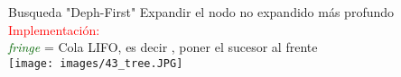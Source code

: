 \begin{frame}{Busqueda "Deph-First"}
    Expandir el nodo no expandido más profundo
    \\
    \textcolor{Red}{\large{Implementación:}}
    \\
    \qquad\qquad\textcolor{DarkGreen}{\textit{fringe}} = Cola LIFO, es decir , poner el sucesor al frente
    \\
    \centering
    \texttt{[image: images/43\_tree.JPG]} 
\end{frame}